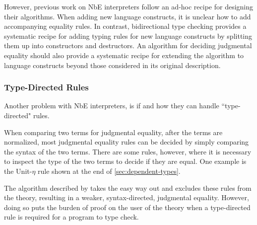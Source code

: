 \documentclass[sigplan]{acmart}
\begin{document}
However, previous work on NbE interpreters follow an ad-hoc recipe for designing their algorithms.
When adding new language constructs, it is unclear how to add accompanying equality rules.
In contrast, bidirectional type checking provides a systematic recipe for adding typing rules for new language constructs by splitting them up into constructors and destructors.
An algorithm for deciding judgmental equality should also provide a systematic recipe for extending the algorithm to language constructs beyond those considered in its original description.


\subsubsection{Type-Directed Rules}

Another problem with NbE interpreters, is if and how they can handle ``type-directed" rules.

When comparing two terms for judgmental equality, after the terms are normalized, most judgmental equality rules can be decided by simply comparing the syntax of the two terms.
There are some rules, however, where it is necessary to inspect the type of the two terms to decide if they are equal.
One example is the Unit-$\eta$ rule shown at the end of \autoref{sec:dependent-types}.

The algorithm described by \citet{Coquand1996} takes the easy way out and excludes these rules from the theory, resulting in a weaker, syntax-directed, judgmental equality.
However, doing so puts the burden of proof on the user of the theory when a type-directed rule is required for a program to type check.
\end{document}
